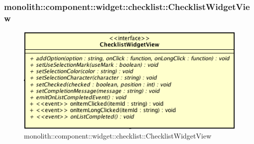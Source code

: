 \subsubsection{monolith::component::widget::checklist::ChecklistWidgetView}

\label{monolith::component::widget::checklist::ChecklistWidgetView}
\begin{figure}[ht]
	\centering
	\includegraphics[scale=0.5]{Sezioni/SottosezioniST/img/ChecklistWidgetView.png}
	\caption{monolith::component::widget::checklist::ChecklistWidgetView}
\end{figure}

